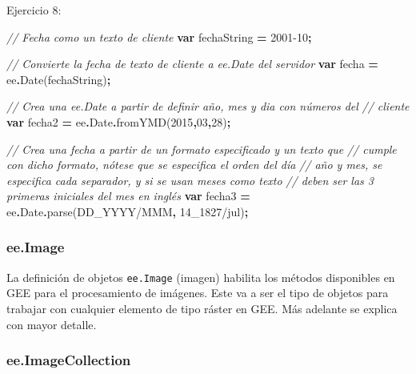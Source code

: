 \documentclass[
  12pt,
  letterpaper,
  twoside]{book}
\newenvironment{Shaded}{\begin{snugshade}}{\end{snugshade}}
\newcommand{\AttributeTok}[1]{\textcolor[rgb]{0.77,0.63,0.00}{#1}}
\newcommand{\CommentTok}[1]{\textcolor[rgb]{0.56,0.35,0.01}{\textit{#1}}}
\newcommand{\DecValTok}[1]{\textcolor[rgb]{0.00,0.00,0.81}{#1}}
\newcommand{\FunctionTok}[1]{\textcolor[rgb]{0.00,0.00,0.00}{#1}}
\newcommand{\KeywordTok}[1]{\textcolor[rgb]{0.13,0.29,0.53}{\textbf{#1}}}
\newcommand{\NormalTok}[1]{#1}
\newcommand{\OperatorTok}[1]{\textcolor[rgb]{0.81,0.36,0.00}{\textbf{#1}}}
\newcommand{\StringTok}[1]{\textcolor[rgb]{0.31,0.60,0.02}{#1}}
\begin{document}
Ejercicio 8:

\begin{Shaded}
\begin{Highlighting}[]
\CommentTok{// Fecha como un texto de cliente}
\KeywordTok{var}\NormalTok{ fechaString }\OperatorTok{=} \StringTok{\textquotesingle{}2001{-}10\textquotesingle{}}\OperatorTok{;}

\CommentTok{// Convierte la fecha de texto de cliente a ee.Date del servidor    }
\KeywordTok{var}\NormalTok{ fecha }\OperatorTok{=}\NormalTok{ ee}\OperatorTok{.}\FunctionTok{Date}\NormalTok{(fechaString)}\OperatorTok{;}  

\CommentTok{// Crea una ee.Date a partir de definir año, mes y dia con números del }
\CommentTok{// cliente           }
\KeywordTok{var}\NormalTok{ fecha2 }\OperatorTok{=}\NormalTok{ ee}\OperatorTok{.}\AttributeTok{Date}\OperatorTok{.}\FunctionTok{fromYMD}\NormalTok{(}\DecValTok{2015}\OperatorTok{,}\DecValTok{03}\OperatorTok{,}\DecValTok{28}\NormalTok{)}\OperatorTok{;} 
   
\CommentTok{// Crea una fecha a partir de un formato especificado y un texto que }
\CommentTok{// cumple con dicho formato, nótese que se especifica el orden del día }
\CommentTok{// año y mes, se especifica cada separador, y si se usan meses como texto}
\CommentTok{// deben ser las 3 primeras iniciales del mes en inglés}
\KeywordTok{var}\NormalTok{ fecha3 }\OperatorTok{=}\NormalTok{ ee}\OperatorTok{.}\AttributeTok{Date}\OperatorTok{.}\FunctionTok{parse}\NormalTok{(}\StringTok{\textquotesingle{}DD\_YYYY/MMM\textquotesingle{}}\OperatorTok{,} \StringTok{\textquotesingle{}14\_1827/jul\textquotesingle{}}\NormalTok{)}\OperatorTok{;} 
\end{Highlighting}
\end{Shaded}

\hypertarget{ee.image}{%
\subsubsection*{ee.Image}\label{ee.image}}

La definición de objetos \texttt{ee.Image} (imagen) habilita los métodos disponibles en GEE para el procesamiento de imágenes. Este va a ser el tipo de objetos para trabajar con cualquier elemento de tipo ráster en GEE. Más adelante se explica con mayor detalle.

\hypertarget{ee.imagecollection}{%
\subsubsection*{ee.ImageCollection}\label{ee.imagecollection}}
\end{document}
